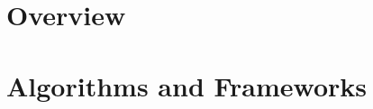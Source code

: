 \documentclass{dune} %
\begin{document}
\pagestyle{titlepage}
%
\cleardoublepage


\cleardoublepage

% 











\part{Overview} %
\label{part:overview}


\cleardoublepage




\cleardoublepage


\cleardoublepage

\part{Algorithms and Frameworks} %
\end{document}
